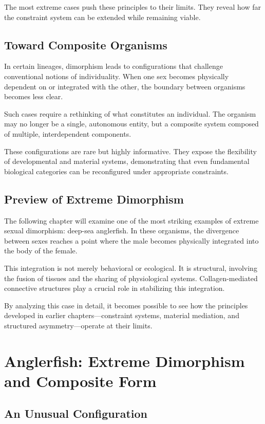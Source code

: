 \documentclass[11pt,oneside]{book}
\begin{document}
The most extreme cases push these principles to their limits. They reveal how far the constraint system can be extended while remaining viable.

\section{Toward Composite Organisms}

In certain lineages, dimorphism leads to configurations that challenge conventional notions of individuality. When one sex becomes physically dependent on or integrated with the other, the boundary between organisms becomes less clear.

Such cases require a rethinking of what constitutes an individual. The organism may no longer be a single, autonomous entity, but a composite system composed of multiple, interdependent components.

These configurations are rare but highly informative. They expose the flexibility of developmental and material systems, demonstrating that even fundamental biological categories can be reconfigured under appropriate constraints.

\section{Preview of Extreme Dimorphism}

The following chapter will examine one of the most striking examples of extreme sexual dimorphism: deep-sea anglerfish. In these organisms, the divergence between sexes reaches a point where the male becomes physically integrated into the body of the female.

This integration is not merely behavioral or ecological. It is structural, involving the fusion of tissues and the sharing of physiological systems. Collagen-mediated connective structures play a crucial role in stabilizing this integration.

By analyzing this case in detail, it becomes possible to see how the principles developed in earlier chapters—constraint systems, material mediation, and structured asymmetry—operate at their limits.

\chapter{Anglerfish: Extreme Dimorphism and Composite Form}

\section{An Unusual Configuration}
\end{document}
